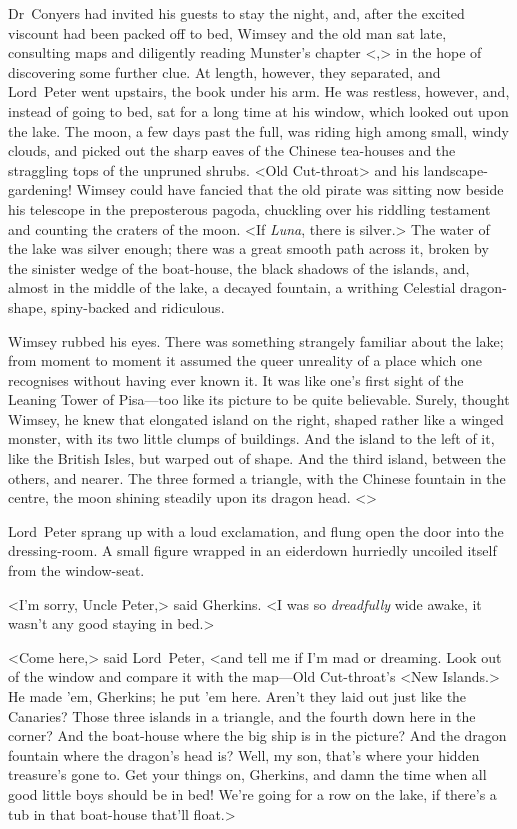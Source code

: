 Dr~Conyers had invited his guests to stay the night, and, after the excited viscount had been packed off to bed, Wimsey and the old man sat late, consulting maps and diligently reading Munster's chapter <,> in the hope of discovering some further clue. At length, however, they separated, and Lord~Peter went upstairs, the book under his arm. He was restless, however, and, instead of going to bed, sat for a long time at his window, which looked out upon the lake. The moon, a few days past the full, was riding high among small, windy clouds, and picked out the sharp eaves of the Chinese tea-houses and the straggling tops of the unpruned shrubs. <Old Cut-throat> and his landscape-gardening! Wimsey could have fancied that the old pirate was sitting now beside his telescope in the preposterous pagoda, chuckling over his riddling testament and counting the craters of the moon. <If \textit{Luna}, there is silver.> The water of the lake was silver enough; there was a great smooth path across it, broken by the sinister wedge of the boat-house, the black shadows of the islands, and, almost in the middle of the lake, a decayed fountain, a writhing Celestial dragon-shape, spiny-backed and ridiculous.

Wimsey rubbed his eyes. There was something strangely familiar about the lake; from moment to moment it assumed the queer unreality of a place which one recognises without having ever known it. It was like one's first sight of the Leaning Tower of Pisa—too like its picture to be quite believable. Surely, thought Wimsey, he knew that elongated island on the right, shaped rather like a winged monster, with its two little clumps of buildings. And the island to the left of it, like the British Isles, but warped out of shape. And the third island, between the others, and nearer. The three formed a triangle, with the Chinese fountain in the centre, the moon shining steadily upon its dragon head. <\longdash>

Lord~Peter sprang up with a loud exclamation, and flung open the door into the dressing-room. A small figure wrapped in an eiderdown hurriedly uncoiled itself from the window-seat.

<I'm sorry, Uncle Peter,> said Gherkins. <I was so \emph{dreadfully} wide awake, it wasn't any good staying in bed.>

<Come here,> said Lord~Peter, <and tell me if I'm mad or dreaming. Look out of the window and compare it with the map—Old Cut-throat's <New Islands.> He made 'em, Gherkins; he put 'em here. Aren't they laid out just like the Canaries? Those three islands in a triangle, and the fourth down here in the corner? And the boat-house where the big ship is in the picture? And the dragon fountain where the dragon's head is? Well, my son, that's where your hidden treasure's gone to. Get your things on, Gherkins, and damn the time when all good little boys should be in bed! We're going for a row on the lake, if there's a tub in that boat-house that'll float.>

